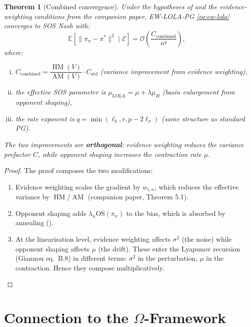 \documentclass[11pt,a4paper]{article}
\newtheorem{theorem}{Theorem}[section]
\DeclareMathOperator{\AM}{AM}
\DeclareMathOperator{\HM}{HM}
\newcommand{\E}{\mathbb{E}}
\newcommand{\cE}{\mathcal{E}}
\begin{document}
\begin{theorem}[Combined convergence]
\label{thm:combined}
Under the hypotheses of  and the evidence-weighting conditions from the companion paper, EW-LOLA-PG \eqref{eq:ew-lola} converges to SOS Nash with:
\begin{equation}
    \E[\|\pi_n - \pi^*\|^2 \mid \cE] = \mathcal{O}\!\left(\frac{C_{\mathrm{combined}}}{n^q}\right),
\end{equation}
where:
\begin{enumerate}[(i)]
    \item $C_{\mathrm{combined}} = \dfrac{\HM(V)}{\AM(V)} \cdot C_{\mathrm{std}}$ \quad (variance improvement from evidence weighting),
    \item the effective SOS parameter is $\mu_{\mathrm{LOLA}} = \mu + \lambda\mu_H$ \quad (basin enlargement from opponent shaping),
    \item the rate exponent is $q = \min(\ell_b, r, p - 2\ell_\sigma)$ \quad (same structure as standard PG).
\end{enumerate}
The two improvements are \textbf{orthogonal}: evidence weighting reduces the variance prefactor $C$, while opponent shaping increases the contraction rate $\mu$.
\end{theorem}

\begin{proof}
The proof composes the two modifications:
\begin{enumerate}
    \item Evidence weighting scales the gradient by $w_{i,n}$, which reduces the effective variance by $\HM/\AM$ (companion paper, Theorem 5.1).
    \item Opponent shaping adds $\lambda_n \mathrm{OS}(\pi_n)$ to the bias, which is absorbed by annealing ().
    \item At the linearisation level, evidence weighting affects $\sigma^2$ (the noise) while opponent shaping affects $\mu$ (the drift). These enter the Lyapunov recursion (Giannou eq.\ B.8) in different terms: $\sigma^2$ in the perturbation, $\mu$ in the contraction. Hence they compose multiplicatively.
\end{enumerate}
\end{proof}


\section{Connection to the $\Omega$-Framework}
\label{sec:omega}
\end{document}
